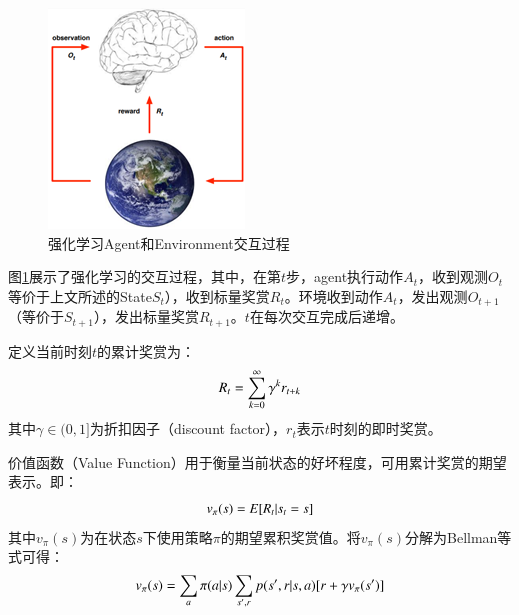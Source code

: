 \begin{figure}
	\centering
	\includegraphics[width=.65\linewidth]{./figures/rl_interaction.png}
	\caption{强化学习Agent和Environment交互过程}
	\label{fig:rl_interaction}
\end{figure}

图\ref{fig:rl_interaction}展示了强化学习的交互过程，其中，在第$t$步，agent执行动作$A_t$，收到观测$O_t$等价于上文所述的State$S_t$），收到标量奖赏$R_t$。环境收到动作$A_t$，发出观测$O_{t+1}$（等价于$S_{t+1}$），发出标量奖赏$R_{t+1}$。$t$在每次交互完成后递增。

定义当前时刻$t$的累计奖赏为：
\begin{equation}
\label{equ:rl_reward}
\setlength{\abovedisplayskip}{10pt}
\setlength{\belowdisplayskip}{10pt}
R_t=\sum_{k=0}^{\infty} \gamma^kr_{t+k}
\end{equation}
其中$\gamma\in(0,1]$为折扣因子（discount factor），$r_t$表示$t$时刻的即时奖赏。

价值函数（Value Function）用于衡量当前状态的好坏程度，可用累计奖赏的期望表示。即：
\begin{equation}
\label{equ:rl_value_function}
\setlength{\abovedisplayskip}{10pt}
\setlength{\belowdisplayskip}{10pt}
v_\pi(s)=E[R_t|s_t=s]
\end{equation}
其中$v_\pi(s)$为在状态$s$下使用策略$\pi$的期望累积奖赏值。将$v_\pi(s)$分解为Bellman等式可得：
\begin{equation}
\label{equ:rl_bellman}
\setlength{\abovedisplayskip}{10pt}
\setlength{\belowdisplayskip}{10pt}
v_\pi(s)=\sum_a \pi(a|s)\sum_{s',r}p(s',r|s,a)[r+\gamma v_\pi(s')]
\end{equation}

